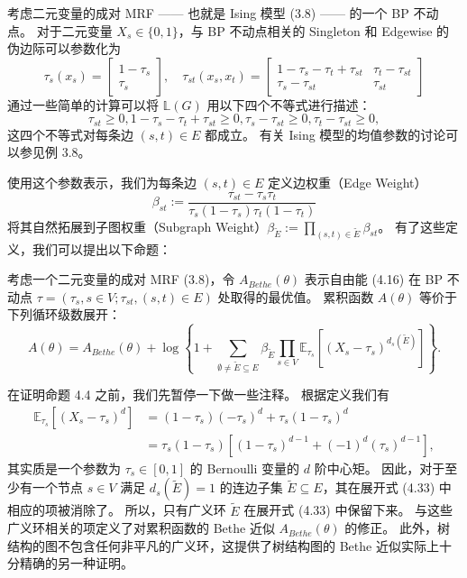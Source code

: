 考虑二元变量的成对 MRF —— 也就是 Ising 模型 (3.8) —— 的一个 BP 不动点。
对于二元变量 $X_s \in \{0, 1\}$，与 BP 不动点相关的 Singleton 和 Edgewise 的伪边际可以参数化为
\begin{equation}
    \tau_s(x_s) = \begin{bmatrix}
        1 - \tau_s \\
        \tau_s
    \end{bmatrix}, \quad \tau_{st}(x_s, x_t) = \begin{bmatrix}
        1 - \tau_s - \tau_t + \tau_{st} & \tau_t - \tau_{st} \\
        \tau_s - \tau_{st} & \tau_{st}
    \end{bmatrix}
\end{equation}
通过一些简单的计算可以将 $\mathbb{L}(G)$ 用以下四个不等式进行描述：
\begin{equation*}
    \tau_{st} \geq 0, 1-\tau_s-\tau_t+\tau_{st} \geq 0, \tau_s-\tau_{st} \geq 0, \tau_t-\tau_{st} \geq 0,
\end{equation*}
这四个不等式对每条边 $(s, t) \in E$ 都成立。
有关 Ising 模型的均值参数的讨论可以参见例 3.8。

使用这个参数表示，我们为每条边 $(s, t) \in E$ 定义边权重（Edge Weight）
\begin{equation}
    \beta_{st} := \frac{\tau_{st}-\tau_s\tau_t}{\tau_s(1-\tau_s)\tau_t(1-\tau_t)}
\end{equation}
将其自然拓展到子图权重（Subgraph Weight）$\beta_{\tilde{E}} := \prod_{(s, t) \in \tilde{E}}\beta_{st}$。
有了这些定义，我们可以提出以下命题：

\begin{tcolorbox}
\begin{prop}

考虑一个二元变量的成对 MRF (3.8)，令 $A_{Bethe}(\theta)$ 表示自由能 (4.16) 在 BP 不动点 $\tau = (\tau_s, s \in V; \tau_{st}, (s, t) \in E)$ 处取得的最优值。
累积函数 $A(\theta)$ 等价于下列循环级数展开：
\begin{equation}
    A(\theta) = A_{Bethe}(\theta) + \log\left\{1+\sum_{\emptyset\neq\tilde{E}\subseteq E}\beta_{\tilde{E}}\prod_{s \in V}\mathbb{E}_{\tau_s}[(X_s - \tau_s)^{d_s(\tilde{E})}]\right\}.
\end{equation}

\end{prop}
\end{tcolorbox}

在证明命题 4.4 之前，我们先暂停一下做一些注释。
根据定义我们有
\begin{align}
    \mathbb{E}_{\tau_s}[(X_s - \tau_s)^d] &= (1-\tau_s)(-\tau_s)^d + \tau_s(1-\tau_s)^d \nonumber \\
    &= \tau_s(1-\tau_s)[(1-\tau_s)^{d-1}+(-1)^d(\tau_s)^{d-1}], 
\end{align}
其实质是一个参数为 $\tau_s \in [0, 1]$ 的 Bernoulli 变量的 $d$ 阶中心矩。
因此，对于至少有一个节点 $s \in V$ 满足 $d_s(\tilde{E}) = 1$ 的连边子集 $\tilde{E} \subseteq E$，其在展开式 (4.33) 中相应的项被消除了。
所以，只有广义环 $\tilde{E}$ 在展开式 (4.33) 中保留下来。
与这些广义环相关的项定义了对累积函数的 Bethe 近似 $A_{Bethe}(\theta)$ 的修正。
此外，树结构的图不包含任何非平凡的广义环，这提供了树结构图的 Bethe 近似实际上十分精确的另一种证明。

